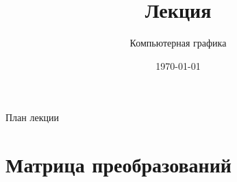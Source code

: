 \documentclass[10pt]{beamer}
\date{\today}
\title{Лекция \lecdni \\ \LectionTheme}
\subtitle{Компьютерная графика}
\begin{document}
 		 


\begin{comment}

\end{comment}

    
    \QRFRAME
	
	
	\frame{\maketitle}
	
	
	
	\begin{frame}{План лекции}
		\tableofcontents
	\end{frame}
	
	
	
	\section{Матрица преобразований}
	
	\frame{\sectionpage}
	
\end{document}
